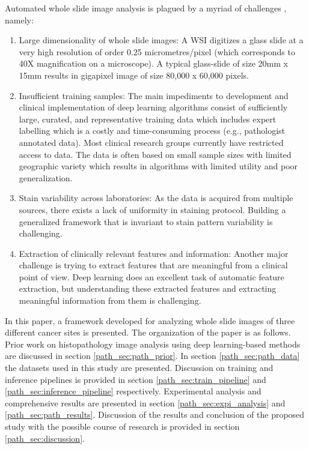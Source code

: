 \documentclass[times,twocolumn,final,authoryear]{tmp}
\begin{document}
Automated whole slide image analysis is plagued by a myriad of challenges \citep{tizhoosh2018artificial}, namely:
\begin{enumerate}
    \item Large dimensionality of whole slide images: A WSI digitizes a glass slide at a very high resolution of order 0.25 micrometres/pixel (which corresponds to 40X magnification on a microscope). A typical glass-slide of size 20mm x 15mm results in gigapixel image of size 80,000 x 60,000 pixels.


    \item Insufficient training samples: The main impediments to development and clinical implementation of deep learning algorithms consist of sufficiently large, curated, and representative training data which includes expert labelling which is a costly and time-consuming process (e.g., pathologist annotated data). Most clinical research groups currently have restricted access to data. The data is often based on small sample sizes with limited geographic variety which results in algorithms with limited utility and poor generalization.
    
    \item Stain variability across laboratories: As the data is acquired from multiple sources, there exists a lack of uniformity in staining protocol. Building a generalized framework that is invariant to stain pattern variability is challenging.
    
    \item Extraction of clinically relevant features and information: Another major challenge is trying to extract features that are meaningful from a clinical point of view. Deep learning does an excellent task of automatic feature extraction, but understanding these extracted features and extracting meaningful information from them is challenging.
\end{enumerate}

In this paper, a framework developed for analyzing whole slide images of three different cancer sites is presented. The organization of the paper is as follows. Prior work on histopathology image analysis using deep learning-based methods are discussed in section \ref{path_sec:path_prior}. In section \ref{path_sec:path_data} the datasets used in this study are presented.  Discussion on training and inference pipelines is provided in section \ref{path_sec:train_pipeline} and \ref{path_sec:inference_pipeline} respectively. Experimental analysis and comprehensive results are presented in section \ref{path_sec:expi_analysis} and \ref{path_sec:path_results}. Discussion of the results and conclusion of the proposed study with the possible course of research is provided in section \ref{path_sec:discussion}. 
\end{document}
